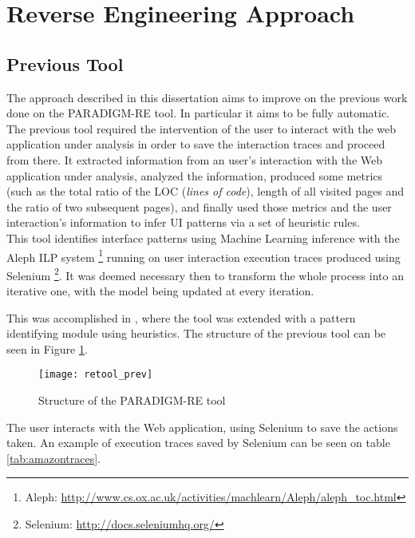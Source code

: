 \section{Reverse Engineering Approach}\label{sec:re}

\subsection{Previous Tool}\label{sec:prev}

The  approach described in this dissertation aims to improve on the previous work \cite{nabuco2013inferring} done on the PARADIGM-RE tool. In particular it aims to be fully automatic. The previous tool required the intervention of the user to interact with the web application under analysis in order to save the interaction traces and proceed from there. It extracted information from an user's interaction with the Web application under analysis, analyzed the information, produced some metrics (such as the total ratio of the LOC (\textit{lines of code}), length of all visited pages and the ratio of two subsequent pages), and finally used those metrics and the user interaction's information to infer UI patterns via a set of heuristic rules. \\
This tool identifies interface patterns using Machine Learning inference with the Aleph ILP system \footnote{Aleph: \url{http://www.cs.ox.ac.uk/activities/machlearn/Aleph/aleph\_toc.html}} running on user interaction execution traces produced using Selenium \footnote{Selenium: \url{http://docs.seleniumhq.org/}}. It was deemed necessary then to transform the whole process into an iterative one, with the model being updated at every iteration. 

This was accomplished in \cite{nabuco2014inferring}, where the tool was extended with a pattern identifying module using heuristics. The structure of the previous tool can be seen in Figure \ref{fig:retool_prev}. 

\begin{figure}[!htb]
 \begin{center}
 \leavevmode
 \texttt{[image: retool\_prev]}
 	\caption[Structure of the PARADIGM-RE tool]{Structure of the PARADIGM-RE tool \cite{nabuco2014inferring}}
 	\label{fig:retool_prev}
 \end{center}
\end{figure}

The user interacts with the Web application, using Selenium to save the actions taken. An example of execution traces saved by Selenium can be seen on table \ref{tab:amazontraces}. 

